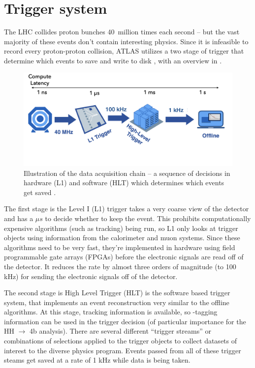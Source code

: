 \section{Trigger system}
\label{sec:atlas-trigger}

The LHC collides proton bunches 40~million times each second -- but the vast majority of these events don't contain interesting physics. Since it is infeasible to record every proton-proton collision, ATLAS utilizes a two stage of trigger that determine which events to save and write to disk \cite{ATLAS_long}, with an overview in \Fig{\ref{fig:trig-latency}}.  

\begin{figure}[h]
\centering
\includegraphics[width=\textwidth]{figures/atlas/trig-latency-graphic}
\caption{Illustration of the data acquisition chain -- a sequence of decisions in hardware (L1) and software (HLT) which determines which events get saved \cite{javier-iaifi-2} \cite{ATL-COM-DAQ-2014-054}.}
\label{fig:trig-latency}
\end{figure}

The first stage is the Level I (L1) trigger takes a very coarse view of the detector and has a $\mu s$ to decide whether to keep the event. This prohibits computationally expensive algorithms (such as tracking) being run, so L1 only looks at trigger objects using information from the calorimeter and muon systems.
Since these algorithms need to be very fast, they're implemented in hardware using field programmable gate arrays (FPGAs) before the electronic signals are read off of the detector.
It reduces the rate by almost three orders of magnitude (to 100 kHz) for sending the electronic signals off of the detector.
 

The second stage is High Level Trigger (HLT) is the software based trigger system, that implements an event reconstruction very similar to the offline algorithms. At this stage, tracking information is available, so \Pqb-tagging information can be used in the trigger decision (of particular importance for the HH $\rightarrow$ 4b analysis). 
There are several different ``trigger streams'' or combinations of selections applied to the trigger objects to collect datasets of interest to the diverse physics program.  Events passed from all of these trigger steams get saved at a rate of 1 kHz while data is being taken. 



